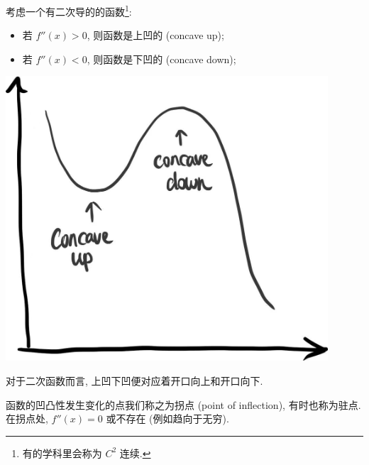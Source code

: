 \begin{tcolorbox}[size=fbox, breakable, enhanced jigsaw, title={二次导和凹凸性}]

考虑一个有二次导的的函数\footnote{有的学科里会称为 $C^2$ 连续.}:

\begin{itemize}

\item
  若 $f''(x)>0$, 则函数是上凹的 (concave up);
\item
  若 $f''(x)<0$, 则函数是下凹的 (concave down);
\end{itemize}

\begin{tcolorbox}[size=fbox, breakable, enhanced jigsaw, sidebyside]
\includegraphics[width=0.9\textwidth]{img/image-20230614143547029.png}
\tcblower
\kaishu{\small }
\end{tcolorbox}

对于二次函数而言, 上凹下凹便对应着开口向上和开口向下.

函数的凹凸性发生变化的点我们称之为拐点 (point of inflection),
有时也称为驻点. 在拐点处, $f''(x)=0$ 或不存在 (例如趋向于无穷).

\end{tcolorbox}

